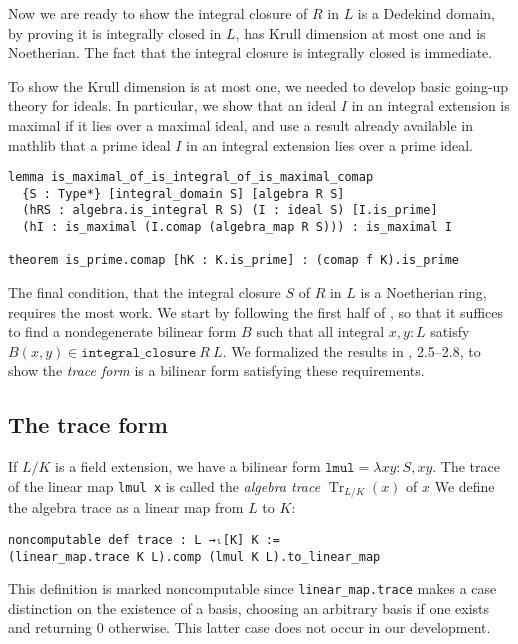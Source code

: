 \documentclass[a4paper,USenglish,cleveref, autoref, thm-restate]{lipics-v2021}
\newcommand{\lean}[1]{\texttt{#1}\xspace} %
\DeclareMathOperator{\Tr}{\mathrm{Tr}}
\newcommand{\mathlib}{\textsf{mathlib}\xspace}
\begin{document}
Now we are ready to show the integral closure of $R$ in $L$ is a Dedekind domain,
by proving it is integrally closed in $L$, has Krull dimension at most one and is Noetherian.
The fact that the integral closure is integrally closed is immediate.

To show the Krull dimension is at most one, we needed to develop basic going-up theory for ideals.
In particular, we show that an ideal $I$ in an integral extension is maximal if it lies over a maximal ideal,
and use a result already available in \mathlib that a prime ideal $I$ in an integral extension lies over a prime ideal.
\begin{lstlisting}
lemma is_maximal_of_is_integral_of_is_maximal_comap
  {S : Type*} [integral_domain S] [algebra R S]
  (hRS : algebra.is_integral R S) (I : ideal S) [I.is_prime]
  (hI : is_maximal (I.comap (algebra_map R S))) : is_maximal I

theorem is_prime.comap [hK : K.is_prime] : (comap f K).is_prime
\end{lstlisting}

The final condition, that the integral closure $S$ of $R$ in $L$ is a Noetherian ring, requires the most work.
We start by following the first half of \cite[Theorem 15.29]{Dummit-and-Foote},
so that it suffices to find a nondegenerate bilinear form $B$ such that all integral $x, y : L$ satisfy $B(x, y) \in \lean{integral\_closure}\ R\ L$.
We formalized the results in \cite{Neukirch}, 2.5--2.8, to show the \emph{trace form} is a bilinear form satisfying these requirements.

\subsection{The trace form}
If $L / K$ is a field extension, we have a bilinear form $\lean{lmul} = \lambda x y : S, xy$.
The trace of the linear map \lean{lmul x} is called the \emph{algebra trace} $\Tr_{L / K}(x)$ of $x$
We define the algebra trace as a linear map from $L$ to $K$:
\begin{lstlisting}
noncomputable def trace : L →ₗ[K] K :=
(linear_map.trace K L).comp (lmul K L).to_linear_map
\end{lstlisting}
This definition is marked noncomputable since \lean{linear\_map.trace} makes a case distinction on the existence of a basis,
choosing an arbitrary basis if one exists and returning $0$ otherwise.
This latter case does not occur in our development.
\end{document}
